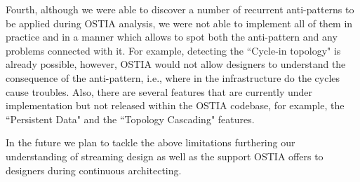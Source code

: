 Fourth, although we were able to discover a number of recurrent anti-patterns to be applied during OSTIA analysis, we were not able to implement all of them in practice and in a manner which allows to spot both the anti-pattern and any problems connected with it. For example, detecting the ``Cycle-in topology" is already possible, however, OSTIA would not allow designers to understand the consequence of the anti-pattern, i.e., where in the infrastructure do the cycles cause troubles. Also, there are several features that are currently under implementation but not released within the OSTIA codebase, for example, the ``Persistent Data" and the ``Topology Cascading" features.

In the future we plan to tackle the above limitations furthering our understanding of streaming design as well as the support OSTIA offers to designers during continuous architecting.

